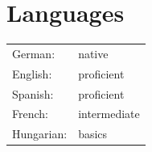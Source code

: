 \documentclass[11pt]{article}
\begin{document}
	\section*{Languages}
	\begin{tabularx}{\textwidth}{lX}
		German: & native \\
		English: & proficient \\
		Spanish: & proficient \\
		French: & intermediate \\
		Hungarian: & basics 
	\end{tabularx}
	

	
\end{document}
